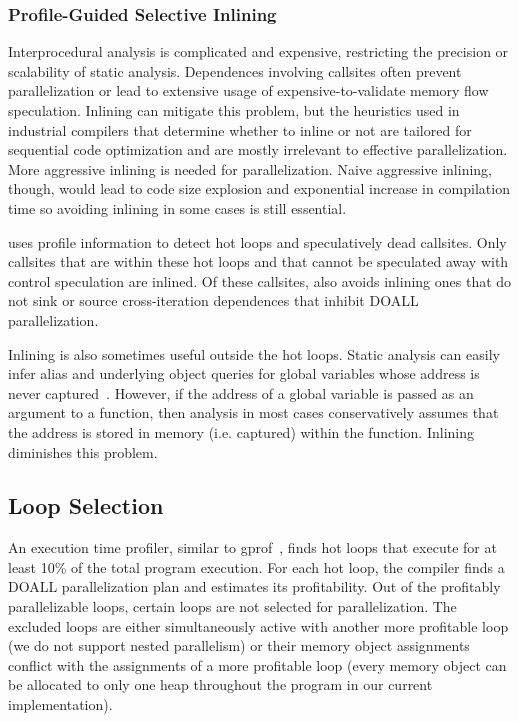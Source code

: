 \subsubsection{Profile-Guided Selective Inlining}

Interprocedural analysis is complicated and expensive, restricting the
precision or scalability of static analysis.
%
Dependences involving callsites often prevent parallelization or lead
to extensive usage of expensive-to-validate memory flow speculation.
%
Inlining can mitigate this problem, but the heuristics used in
industrial compilers that determine whether to inline or not are tailored
for sequential code optimization and are mostly irrelevant to
effective parallelization.
%
%
More aggressive inlining is needed for parallelization. Naive
aggressive inlining, though, would lead to code size explosion and
exponential increase in compilation time so avoiding inlining in some
cases
is still essential.
%

\name uses profile information to detect hot loops and speculatively
dead callsites. Only callsites that are within these hot loops and
that cannot be speculated away with control speculation are inlined.
%
Of these callsites, \name also avoids inlining ones that do not
sink or source cross-iteration dependences that inhibit DOALL
parallelization.
%

Inlining is also sometimes useful outside the hot loops.
%
Static analysis can easily infer alias and underlying object queries
for global variables whose address is never
captured~\cite{johnson:14:pldi}. However, if the address of a global
variable is passed as an argument to a function, then analysis in
most cases conservatively assumes that the address is stored in memory
(i.e. captured) within the function. Inlining diminishes this
problem.


\subsection{Loop Selection} An execution time profiler, similar to
gprof~\cite{gnu:binutils:web}, finds hot loops that execute for at least 10\%
of the total program execution.
%
For each hot loop, the compiler finds a DOALL parallelization plan and
estimates its profitability.
%
Out of the profitably parallelizable loops, certain loops are not
selected for parallelization. The excluded loops are either
simultaneously active with another more profitable loop (we do not
support nested parallelism) or their memory object assignments
conflict with the assignments of a more profitable loop (every memory
object can be allocated to only one heap throughout the program in our
current implementation).

